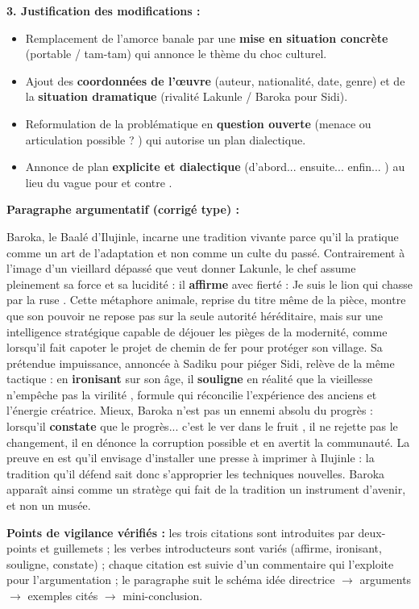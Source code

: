 \documentclass[11pt]{article}
\begin{document}
\begin{corrige}
\textbf{3. Justification des modifications :}
\begin{itemize}
\item Remplacement de l'amorce banale par une \textbf{mise en situation concrète} (portable / tam-tam) qui annonce le thème du choc culturel.
\item Ajout des \textbf{coordonnées de l'œuvre} (auteur, nationalité, date, genre) et de la \textbf{situation dramatique} (rivalité Lakunle / Baroka pour Sidi).
\item Reformulation de la problématique en \textbf{question ouverte} (\og menace ou articulation possible ? \fg) qui autorise un plan dialectique.
\item Annonce de plan \textbf{explicite et dialectique} (\og d'abord... ensuite... enfin... \fg) au lieu du vague \og pour et contre \fg.
\end{itemize}
\end{corrige}

\begin{corrige}
\textbf{Paragraphe argumentatif (corrigé type) :}

Baroka, le Baalé d'Ilujinle, incarne une tradition vivante parce qu'il la pratique comme un art de l'adaptation et non comme un culte du passé. Contrairement à l'image d'un vieillard dépassé que veut donner Lakunle, le chef assume pleinement sa force et sa lucidité : il \textbf{affirme} avec fierté : \og Je suis le lion qui chasse par la ruse \fg. Cette métaphore animale, reprise du titre même de la pièce, montre que son pouvoir ne repose pas sur la seule autorité héréditaire, mais sur une intelligence stratégique capable de déjouer les pièges de la modernité, comme lorsqu'il fait capoter le projet de chemin de fer pour protéger son village. Sa prétendue impuissance, annoncée à Sadiku pour piéger Sidi, relève de la même tactique : en \textbf{ironisant} sur son âge, il \textbf{souligne} en réalité que \og la vieillesse n'empêche pas la virilité \fg, formule qui réconcilie l'expérience des anciens et l'énergie créatrice. Mieux, Baroka n'est pas un ennemi absolu du progrès : lorsqu'il \textbf{constate} que \og le progrès... c'est le ver dans le fruit \fg, il ne rejette pas le changement, il en dénonce la corruption possible et en avertit la communauté. La preuve en est qu'il envisage d'installer une presse à imprimer à Ilujinle : la tradition qu'il défend sait donc s'approprier les techniques nouvelles. Baroka apparaît ainsi comme un stratège qui fait de la tradition un instrument d'avenir, et non un musée.

\textbf{Points de vigilance vérifiés :} les trois citations sont introduites par deux-points et guillemets ; les verbes introducteurs sont variés (affirme, ironisant, souligne, constate) ; chaque citation est suivie d'un commentaire qui l'exploite pour l'argumentation ; le paragraphe suit le schéma idée directrice $\rightarrow$ arguments $\rightarrow$ exemples cités $\rightarrow$ mini-conclusion.
\end{corrige}
\end{document}
